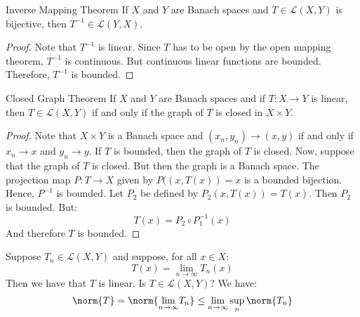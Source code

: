 \documentclass[crop=false,class=book,oneside]{standalone}
\begin{document}
        \begin{ltheorem}{Inverse Mapping Theorem}
            If $X$ and $Y$ are Banach spaces and
            $T\in\mathcal{L}(X,Y)$ is bijective, then
            $T^{\minus{1}}\in\mathcal{L}(Y,X)$.
        \end{ltheorem}
        \begin{proof}
            Note that $T^{\minus{1}}$ is linear. Since $T$ has to be
            open by the open mapping theorem, $T^{\minus{1}}$ is
            continuous. But continuous linear functions are bounded.
            Therefore, $T^{\minus{1}}$ is bounded.
        \end{proof}
        \begin{ltheorem}{Closed Graph Theorem}
            If $X$ and $Y$ are Banach spaces and if
            $T:X\rightarrow{Y}$ is linear, then
            $T\in\mathcal{L}(X,Y)$ if and only if the graph of
            $T$ is closed in $X\times{Y}$.
        \end{ltheorem}
        \begin{proof}
            Note that $X\times{Y}$ is a Banach space and
            $(x_{n},y_{n})\rightarrow(x,y)$ if and only if
            $x_{n}\rightarrow{x}$ and $y_{n}\rightarrow{y}$.
            If $T$ is bounded, then the graph of $T$ is closed.
            Now, suppose that the graph of $T$ is closed. But
            then the graph is a Banach space. The projection map
            $P:T\rightarrow{X}$ given by $P((x,T(x))=x$ is
            a bounded bijection. Hence, $P^{\minus{1}}$ is bounded.
            Let $P_{2}$ be defined by $P_{2}(x,T(x))=T(x)$. Then
            $P_{2}$ is bounded. But:
            \begin{equation}
                T(x)=P_{2}\circ{P}_{1}^{\minus{1}}(x)
            \end{equation}
            And therefore $T$ is bounded.
        \end{proof}
        \begin{lexample}
            Suppose $T_{n}\in\mathcal{L}(X,Y)$ and suppose, for
            all $x\in{X}$:
            \begin{equation}
                T(x)=\underset{n\rightarrow\infty}{\lim}T_{n}(x)
            \end{equation}
            Then we have that $T$ is linear. Is
            $T\in\mathcal{L}(X,Y)$? We have:
            \begin{equation}
                \norm{T}=
                \norm{\underset{n\rightarrow\infty}{\lim}T_{n}}
                \leq\underset{n\rightarrow\infty}{\lim}\sup_{n}
                \norm{T_{n}}
            \end{equation}
        \end{lexample}
\end{document}
